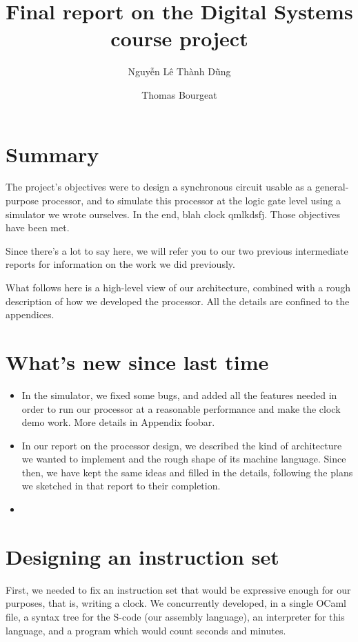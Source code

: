 \documentclass[a4paper, 11pt]{article}
\begin{document}
\title{Final report on the Digital Systems course project}
\author{Nguyễn Lê Thành Dũng \and Thomas Bourgeat}

\maketitle

\section{Summary}

The project's objectives were to design a synchronous circuit usable as a general-purpose processor, and to simulate this processor at the logic gate level using a simulator we wrote ourselves. In the end, blah clock qmlkdsfj.
Those objectives have been met.

Since there's a lot to say here, we will refer you to our two previous intermediate reports for information on the work we did previously.

What follows here is a high-level view of our architecture, combined with a rough description of how we developed the processor. All the details are confined to the appendices.

\section{What's new since last time}

\begin{itemize}
\item In the simulator, we fixed some bugs, and added all the features needed in order to run our processor at a reasonable performance and make the clock demo work. More details in Appendix foobar.
\item In our report on the processor design, we described the kind of architecture we wanted to implement and the rough shape of its machine language. Since then, we have kept the same ideas and filled in the details, following the plans we sketched in that report to their completion.
\item 
\end{itemize}



\section{Designing an instruction set}

First, we needed to fix an instruction set that would be expressive enough for our purposes, that is, writing a clock. We concurrently developed, in a single OCaml file, a syntax tree for the S-code (our assembly language), an interpreter for this language, and a program which would count seconds and minutes. 
\end{document}
